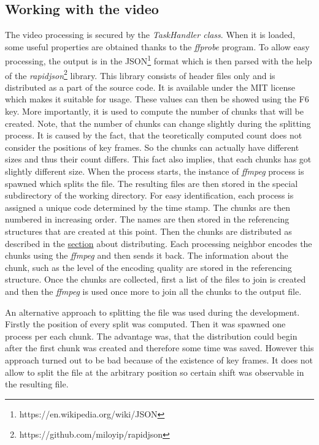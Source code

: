 \subsection*{Working with the video}

The video processing is secured by the \textit{TaskHandler class}. When
it is loaded, some useful properties are obtained thanks to the
\textit{ffprobe} program. To allow easy processing, the output is in the
JSON\footnote{https://en.wikipedia.org/wiki/JSON} format which is then
parsed with the help of the
\textit{rapidjson}\footnote{https://github.com/miloyip/rapidjson}
library. This library consists of header files only and is distributed
as a part of the source code. It is available under the MIT license
which makes it suitable for usage. These values can then be showed using
the F6 key. More importantly, it is used to compute the number of chunks
that will be created. Note, that the number of chunks can change
slightly during the splitting process. It is caused by the fact, that
the teoretically computed count does not consider the positions of key
frames. So the chunks can actually have different sizes and thus their
count differs. This fact also implies, that each chunks has got slightly
different size. When the process starts, the instance of \textit{ffmpeg}
process is spawned which splits the file. The resulting files are then
stored in the special subdirectory of the working directory. For easy
identification, each process is assigned a unique code determined by the
time stamp. The chunks are then numbered in increasing order. The names
are then stored in the referencing structures that are created at this
point. Then the chunks are distributed as described in the
\hyperref[distribution-of-chunks]{section} about distributing. Each
processing neighbor encodes the chunks using the \textit{ffmpeg} and
then sends it back. The information about the chunk, such as the level
of the encoding quality are stored in the referencing structure. Once
the chunks are collected, first a list of the files to join is created
and then the \textit{ffmpeg} is used once more to join all the chunks to
the output file.

An alternative approach to splitting the file was used during the
development. Firstly the position of every split was computed. Then it
was spawned one process per each chunk. The advantage was, that the
distribution could begin after the first chunk was created and therefore
some time was saved. However this approach turned out to be bad because
of the existence of key frames. It does not allow to split the file at
the arbitrary position so certain shift was observable in the resulting
file.

